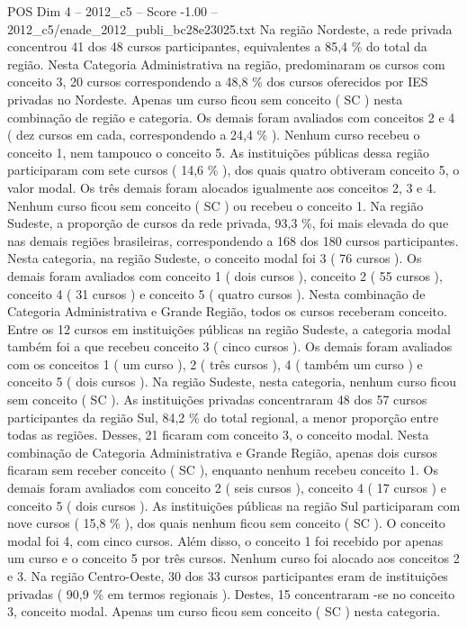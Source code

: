 \begin{textsample}{POS Dim 4 – 2012\_c5 – Score -1.00 – 2012\_c5/enade\_2012\_publi\_bc28e23025.txt}
Na região Nordeste, a rede privada concentrou 41 dos 48 cursos participantes, equivalentes a 85,4 \% do total da região.
Nesta Categoria Administrativa na região, predominaram os cursos com conceito 3, 20 cursos correspondendo a 48,8 \% dos cursos oferecidos por IES privadas no Nordeste.
Apenas um curso ficou sem conceito ( SC ) nesta combinação de região e categoria.
Os demais foram avaliados com conceitos 2 e 4 ( dez cursos em cada, correspondendo a 24,4 \% ).
Nenhum curso recebeu o conceito 1, nem tampouco o conceito 5.
As instituições públicas dessa região participaram com sete cursos ( 14,6 \% ), dos quais quatro obtiveram conceito 5, o valor modal.
Os três demais foram alocados igualmente aos conceitos 2, 3 e 4.
Nenhum curso ficou sem conceito ( SC ) ou recebeu o conceito 1.
Na região Sudeste, a proporção de cursos da rede privada, 93,3 \%, foi mais elevada do que nas demais regiões brasileiras, correspondendo a 168 dos 180 cursos participantes.
Nesta categoria, na região Sudeste, o conceito modal foi 3 ( 76 cursos ).
Os demais foram avaliados com conceito 1 ( dois cursos ), conceito 2 ( 55 cursos ), conceito 4 ( 31 cursos ) e conceito 5 ( quatro cursos ).
Nesta combinação de Categoria Administrativa e Grande Região, todos os cursos receberam conceito.
Entre os 12 cursos em instituições públicas na região Sudeste, a categoria modal também foi a que recebeu conceito 3 ( cinco cursos ).
Os demais foram avaliados com os conceitos 1 ( um curso ), 2 ( três cursos ), 4 ( também um curso ) e conceito 5 ( dois cursos ).
Na região Sudeste, nesta categoria, nenhum curso ficou sem conceito ( SC ).
As instituições privadas concentraram 48 dos 57 cursos participantes da região Sul, 84,2 \% do total regional, a menor proporção entre todas as regiões.
Desses, 21 ficaram com conceito 3, o conceito modal.
Nesta combinação de Categoria Administrativa e Grande Região, apenas dois cursos ficaram sem receber conceito ( SC ), enquanto nenhum recebeu conceito 1.
Os demais foram avaliados com conceito 2 ( seis cursos ), conceito 4 ( 17 cursos ) e conceito 5 ( dois cursos ).
As instituições públicas na região Sul participaram com nove cursos ( 15,8 \% ), dos quais nenhum ficou sem conceito ( SC ).
O conceito modal foi 4, com cinco cursos.
Além disso, o conceito 1 foi recebido por apenas um curso e o conceito 5 por três cursos.
Nenhum curso foi alocado aos conceitos 2 e 3.
Na região Centro-Oeste, 30 dos 33 cursos participantes eram de instituições privadas ( 90,9 \% em termos regionais ).
Destes, 15 concentraram -se no conceito 3, conceito modal.
Apenas um curso ficou sem conceito ( SC ) nesta categoria.

\end{textsample}
